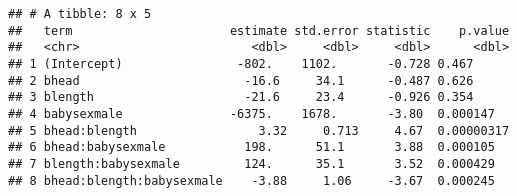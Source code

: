 \documentclass[
]{article}
\begin{document}
\begin{verbatim}
## # A tibble: 8 x 5
##   term                      estimate std.error statistic    p.value
##   <chr>                        <dbl>     <dbl>     <dbl>      <dbl>
## 1 (Intercept)                -802.    1102.       -0.728 0.467     
## 2 bhead                       -16.6     34.1      -0.487 0.626     
## 3 blength                     -21.6     23.4      -0.926 0.354     
## 4 babysexmale               -6375.    1678.       -3.80  0.000147  
## 5 bhead:blength                 3.32     0.713     4.67  0.00000317
## 6 bhead:babysexmale           198.      51.1       3.88  0.000105  
## 7 blength:babysexmale         124.      35.1       3.52  0.000429  
## 8 bhead:blength:babysexmale    -3.88     1.06     -3.67  0.000245
\end{verbatim}
\end{document}
